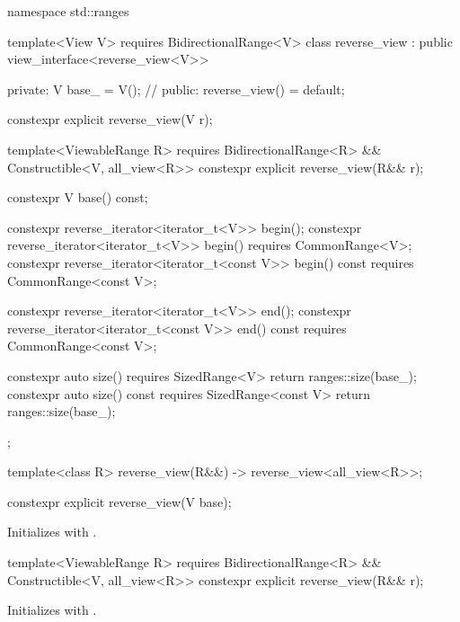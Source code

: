 %
\begin{codeblock}
namespace std::ranges {
  template<View V>
    requires BidirectionalRange<V>
  class reverse_view : public view_interface<reverse_view<V>> {
  private:
    V base_ = V();  // \expos
  public:
    reverse_view() = default;

    constexpr explicit reverse_view(V r);

    template<ViewableRange R>
      requires BidirectionalRange<R> && Constructible<V, all_view<R>>
    constexpr explicit reverse_view(R&& r);

    constexpr V base() const;

    constexpr reverse_iterator<iterator_t<V>> begin();
    constexpr reverse_iterator<iterator_t<V>> begin() requires CommonRange<V>;
    constexpr reverse_iterator<iterator_t<const V>> begin() const
      requires CommonRange<const V>;

    constexpr reverse_iterator<iterator_t<V>> end();
    constexpr reverse_iterator<iterator_t<const V>> end() const
      requires CommonRange<const V>;

    constexpr auto size() requires SizedRange<V> {
      return ranges::size(base_);
    }
    constexpr auto size() const requires SizedRange<const V> {
      return ranges::size(base_);
    }
  };

  template<class R>
    reverse_view(R&&) -> reverse_view<all_view<R>>;
}
\end{codeblock}

%
\begin{itemdecl}
constexpr explicit reverse_view(V base);
\end{itemdecl}

\begin{itemdescr}
\pnum
\effects Initializes  with .
\end{itemdescr}

%
\begin{itemdecl}
template<ViewableRange R>
  requires BidirectionalRange<R> && Constructible<V, all_view<R>>
constexpr explicit reverse_view(R&& r);
\end{itemdecl}

\begin{itemdescr}
\pnum
\effects Initializes  with .
\end{itemdescr}


